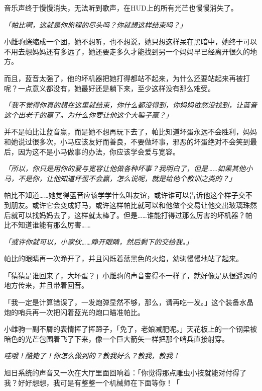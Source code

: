 音乐声终于慢慢消失，无法听到歌声，在HUD上的所有光芒也慢慢消失了。

\horizonline

\unknowndaytimeplace

\emph{「帕比啊，这就是你旅程的尽头吗？你就想这样结束吗？」}

小雌驹蜷缩成一个团，她不想听，也不想说，她只想这样呆在黑暗中，她终于可以不用去想妈妈还有多远了，她还要走多久才能找到另一个妈妈早已经离开很久的地方。

而且，蓝音太强了，他的坏机器把她打得都站不起来，为什么还要站起来再被打呢？一点意义都没有，她最好还是躺下来，至少这样没有那么难受。

\emph{「我不觉得你真的想在这里就结束，你什么都没得到，你妈妈依然没找到，让蓝音这个出老千的赢了。为什么你要让他这个大骗子赢？」}

并不是帕比让蓝音赢，而是她不想再玩下去了，帕比知道坏蛋永远不会胜利，妈妈和她说过很多次，小马应该友好而善良，不要做坏事，邪恶的坏蛋绝对不会笑到最后，因为这不是小马做事的办法，你应该学会爱与宽容。

\emph{「所以，你只是用你的爱与宽容让他做各种坏事？我明白了，但是……如果其他小马，不是你，让他知道坏蛋不会赢，怎么说呢，就是给他个教训之类的？」}

帕比不知道……她觉得蓝音应该学学什么叫友谊，或许谁可以告诉他这个样子交不到朋友。或许它会变成好马，或许这样帕比就可以和他做个交易让他交出玻璃珠然后就可以找妈妈去了，这样就太棒了。但是……谁能打得过那么厉害的坏机器？帕比不知道谁能有那么厉害……{}

\emph{「或许你就可以，小家伙……睁开眼睛，然后剩下的交给我。」}

\horizonline


帕比的眼睛再一次睁开了，并且闪烁着蓝黑色的火焰，幼驹慢慢地站了起来。

「猜猜是谁回来了，大坏蛋？」小雌驹的声音变得不一样了，就好像是从很遥远的地方传来，并且带着回音。

「我一定是计算错误了，一发炮弹显然不够，那么，请再吃一发。」这个装备水晶炮的哨兵再一次把闪着蓝光的炮口瞄准帕比。

小雌驹一副不屑的表情挥了挥蹄子，「免了，老娘减肥呢。」天花板上的一个钢梁被暗色的光芒包围着飞了下来，像一个巨大箭矢一样把那个哨兵直接射穿。

\emph{哇哦！酷毙了！你怎么做到的？教我好么？教我，教我！}

旭日系统的声音又一次在大厅里面回响着：「你觉得那点雕虫小技就能对付得了我？好好想想，我可是有整整一个机械师在下面等你！「

